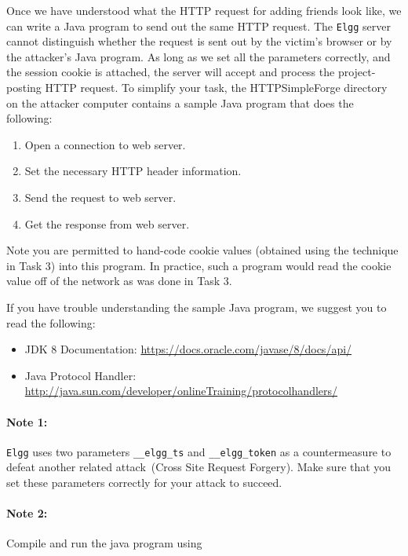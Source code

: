 Once we have understood what the HTTP request for adding friends look like, 
we can write a Java program to send out the 
same HTTP request. The {\tt Elgg} server cannot distinguish whether 
the request is sent out by the victim's browser or by the attacker's
Java program. As long as we set all the parameters correctly,
and the session cookie is attached, the server will accept and process the 
project-posting HTTP request.
To simplify your task, the HTTPSimpleForge directory on the attacker computer
contains a sample Java program that does the 
following:

\begin{enumerate}
\item Open a connection to web server.
\item Set the necessary HTTP header information.
\item Send the request to web server.
\item Get the response from web server. 
\end{enumerate}

Note you are permitted to hand-code cookie values (obtained using
the technique in Task 3) into this program.  In practice, such
a program would read the cookie value off of the network as was
done in Task 3.

If you have trouble understanding the sample Java program, 
we suggest you to read the following:

\begin{itemize}
\item JDK 8 Documentation: \url{https://docs.oracle.com/javase/8/docs/api/}
\item Java Protocol Handler:\\ 
\url{http://java.sun.com/developer/onlineTraining/protocolhandlers/}
\end{itemize}

\paragraph{Note 1:} {\tt Elgg} uses two parameters {\tt \_\_elgg\_ts} and
{\tt \_\_elgg\_token} as a countermeasure to defeat another related 
attack~(Cross Site Request Forgery). Make sure that you set these 
parameters correctly for your attack to succeed.

\paragraph{Note 2:} Compile and run the java program using

